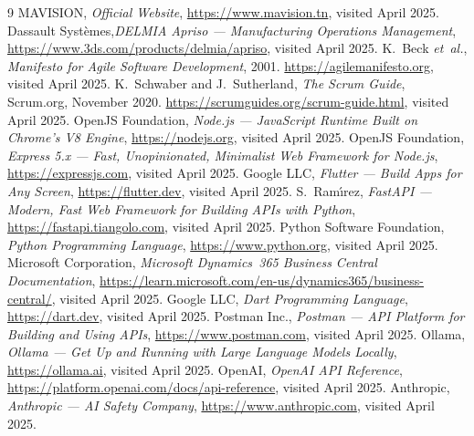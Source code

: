 \documentclass[12pt,a4paper]{report}
\begin{document}
{
  \setlength{\cftbeforelottitleskip}{0pt}
  \setlength{\cftafterlottitleskip}{10pt}
  \renewcommand{\bibname}{Webography}
  \begin{thebibliography}{9}
      MAVISION, \textit{Official Website}, \url{https://www.mavision.tn},
      visited April 2025. 
      Dassault Syst\`{e}mes,\textit{DELMIA Apriso --- Manufacturing Operations Management},
      \url{https://www.3ds.com/products/delmia/apriso}, visited April 2025. 
      K.~Beck \textit{et~al.},
      \textit{Manifesto for Agile Software Development}, 2001.
      \url{https://agilemanifesto.org}, visited April 2025.    
      K.~Schwaber and J.~Sutherland,
      \textit{The Scrum Guide},
      Scrum.org, November 2020.
      \url{https://scrumguides.org/scrum-guide.html}, visited April 2025.
      OpenJS Foundation,
      \textit{Node.js --- JavaScript Runtime Built on Chrome's V8 Engine},
      \url{https://nodejs.org}, visited April 2025. 
      OpenJS Foundation,
      \textit{Express 5.x --- Fast, Unopinionated, Minimalist Web Framework for Node.js},
      \url{https://expressjs.com}, visited April 2025.   
      Google LLC,
      \textit{Flutter --- Build Apps for Any Screen},
      \url{https://flutter.dev}, visited April 2025.   
      S.~Ram\'{\i}rez,
      \textit{FastAPI --- Modern, Fast Web Framework for Building APIs with Python},
      \url{https://fastapi.tiangolo.com}, visited April 2025.
      Python Software Foundation,
      \textit{Python Programming Language},
      \url{https://www.python.org}, visited April 2025.
      Microsoft Corporation,
      \textit{Microsoft Dynamics~365 Business Central Documentation},
      \url{https://learn.microsoft.com/en-us/dynamics365/business-central/},
      visited April 2025.
      Google LLC,
      \textit{Dart Programming Language},
      \url{https://dart.dev}, visited April 2025.
      Postman Inc.,
      \textit{Postman --- API Platform for Building and Using APIs},
      \url{https://www.postman.com}, visited April 2025.
      Ollama,
      \textit{Ollama --- Get Up and Running with Large Language Models Locally},
      \url{https://ollama.ai}, visited April 2025.
      OpenAI,
      \textit{OpenAI API Reference},
      \url{https://platform.openai.com/docs/api-reference}, visited April 2025.
      Anthropic,
      \textit{Anthropic --- AI Safety Company},
      \url{https://www.anthropic.com}, visited April 2025.
  \end{thebibliography}
}
\end{document}
